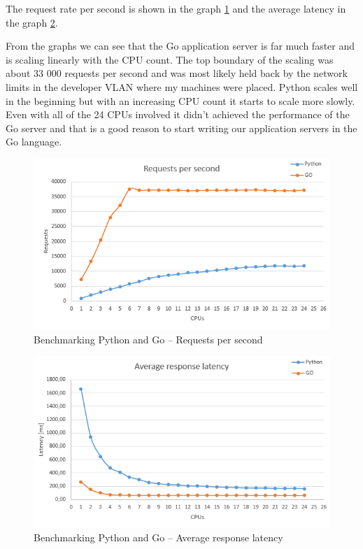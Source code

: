 The request rate per second is shown in the graph \ref{fig:benchmark-requests} and the average latency in the graph \ref{fig:benchmark-latency}.

From the graphs we can see that the Go application server is far much faster and is scaling linearly with the CPU count. The top boundary of the scaling was about 33 000 requests per second and was most likely held back by the network limits in the developer VLAN where my machines were placed. Python scales well in the beginning but with an increasing CPU count it starts to scale more slowly. Even with all of the 24 CPUs involved it didn’t achieved the performance of the Go server and that is a good reason to start writing our application servers in the Go language.

\begin{figure}[htb]\centering
  \includegraphics[width=1\textwidth]{images/benchmark-requests.png}
  \caption
    {Benchmarking Python and Go -- Requests per second}
  \label{fig:benchmark-requests}
\end{figure}
                                                  
\begin{figure}[htb]\centering
  \includegraphics[width=1\textwidth]{images/benchmark-latency.png}
  \caption
    {Benchmarking Python and Go -- Average response latency}
  \label{fig:benchmark-latency}
\end{figure}
                                                  
